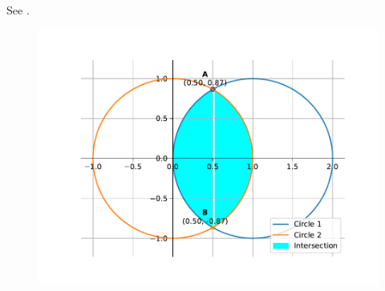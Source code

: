 See .
\begin{figure}[H]
	\begin{center} 
	    \includegraphics[width=0.75\columnwidth]{chapters/12/8/2/2/figs/fig.pdf}
	\end{center}
\caption{}
\label{fig:chapters/12/8/2/2/Fig1}
\end{figure}


















